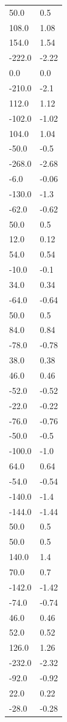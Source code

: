 \begin{longtable}{ll}
50.0 & 0.5 \\
108.0 & 1.08 \\
154.0 & 1.54 \\
-222.0 & -2.22 \\
0.0 & 0.0 \\
-210.0 & -2.1 \\
112.0 & 1.12 \\
-102.0 & -1.02 \\
104.0 & 1.04 \\
-50.0 & -0.5 \\
-268.0 & -2.68 \\
-6.0 & -0.06 \\
-130.0 & -1.3 \\
-62.0 & -0.62 \\
50.0 & 0.5 \\
12.0 & 0.12 \\
54.0 & 0.54 \\
-10.0 & -0.1 \\
34.0 & 0.34 \\
-64.0 & -0.64 \\
50.0 & 0.5 \\
84.0 & 0.84 \\
-78.0 & -0.78 \\
38.0 & 0.38 \\
46.0 & 0.46 \\
-52.0 & -0.52 \\
-22.0 & -0.22 \\
-76.0 & -0.76 \\
-50.0 & -0.5 \\
-100.0 & -1.0 \\
64.0 & 0.64 \\
-54.0 & -0.54 \\
-140.0 & -1.4 \\
-144.0 & -1.44 \\
50.0 & 0.5 \\
50.0 & 0.5 \\
140.0 & 1.4 \\
70.0 & 0.7 \\
-142.0 & -1.42 \\
-74.0 & -0.74 \\
46.0 & 0.46 \\
52.0 & 0.52 \\
126.0 & 1.26 \\
-232.0 & -2.32 \\
-92.0 & -0.92 \\
22.0 & 0.22 \\
-28.0 & -0.28 \\

\end{longtable}
